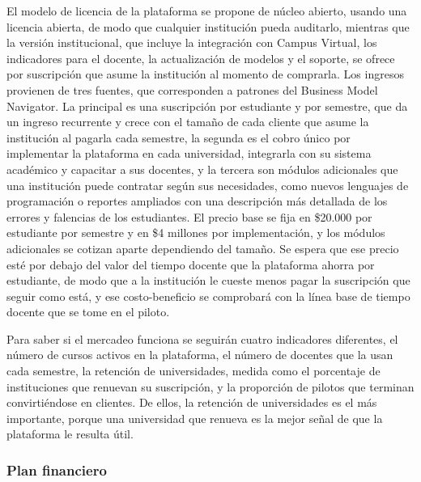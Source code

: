 \documentclass[letterpaper, 10 pt, conference]{ieeeconf}
\begin{document}
El modelo de licencia de la plataforma se propone de núcleo abierto, usando una licencia abierta, de modo que cualquier institución pueda auditarlo, mientras que la versión institucional, que incluye la integración con Campus Virtual, los indicadores para el docente, la actualización de modelos y el soporte, se ofrece por suscripción que asume la institución al momento de comprarla.
Los ingresos provienen de tres fuentes, que corresponden a patrones del Business Model Navigator.
La principal es una suscripción por estudiante y por semestre, que da un ingreso recurrente y crece con el tamaño de cada cliente que asume la institución al pagarla cada semestre, la segunda es el cobro único por implementar la plataforma en cada universidad, integrarla con su sistema académico y capacitar a sus docentes, y la tercera son módulos adicionales que una institución puede contratar según sus necesidades, como nuevos lenguajes de programación o reportes ampliados con una descripción más detallada de los errores y falencias de los estudiantes.
El precio base se fija en \$20.000 por estudiante por semestre y en \$4 millones por implementación, y los módulos adicionales se cotizan aparte dependiendo del tamaño.
Se espera que ese precio esté por debajo del valor del tiempo docente que la plataforma ahorra por estudiante, de modo que a la institución le cueste menos pagar la suscripción que seguir como está, y ese costo-beneficio se comprobará con la línea base de tiempo docente que se tome en el piloto.

Para saber si el mercadeo funciona se seguirán cuatro indicadores diferentes, el número de cursos activos en la plataforma, el número de docentes que la usan cada semestre, la retención de universidades, medida como el porcentaje de instituciones que renuevan su suscripción, y la proporción de pilotos que terminan convirtiéndose en clientes.
De ellos, la retención de universidades es el más importante, porque una universidad que renueva es la mejor señal de que la plataforma le resulta útil.

\subsubsection{Plan financiero}
\end{document}
